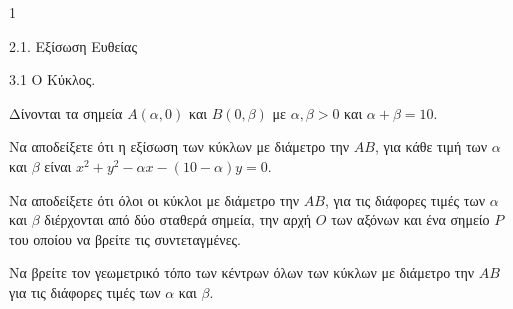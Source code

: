 \begin{ylh}{1}
    \item 2.1. Εξίσωση Ευθείας
    \item 3.1 Ο Κύκλος.
\end{ylh}
Δίνονται τα σημεία $A(\alpha, 0)$ και $B(0, \beta)$ με $\alpha, \beta > 0$ και $\alpha + \beta = 10$.
\begin{alist}
\item Να αποδείξετε ότι η εξίσωση των κύκλων με διάμετρο την $AB$, για κάθε τιμή των $\alpha$ και $\beta$ είναι $x^2 + y^2 - \alpha x - (10 - \alpha)y = 0$. 
\item Να αποδείξετε ότι όλοι οι κύκλοι με διάμετρο την $AB$, για τις διάφορες τιμές των $\alpha$ και $\beta$ διέρχονται από δύο σταθερά σημεία, την αρχή $O$ των αξόνων και ένα σημείο $P$ του οποίου να βρείτε τις συντεταγμένες. 
\item Να βρείτε τον γεωμετρικό τόπο των κέντρων όλων των κύκλων με διάμετρο την $AB$ για τις διάφορες τιμές των $\alpha$ και $\beta$. 
\end{alist}